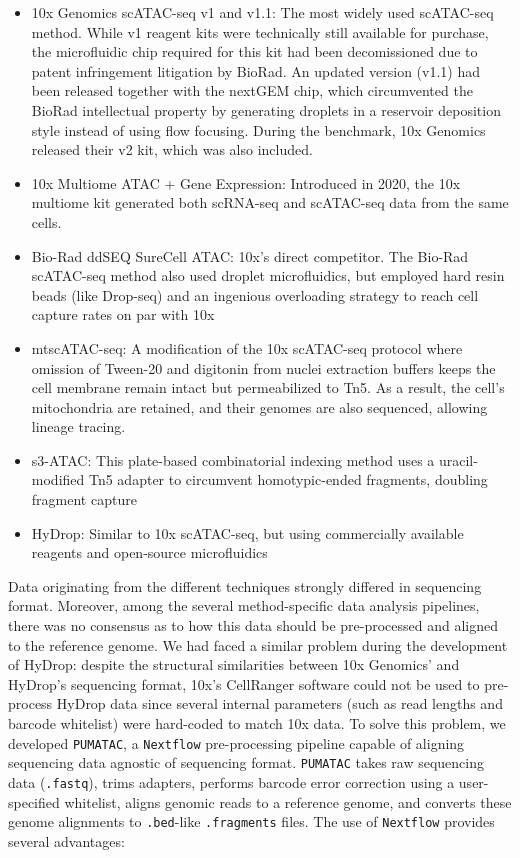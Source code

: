 \begin{itemize}[noitemsep]
	\item 10x Genomics scATAC-seq v1 and v1.1: The most widely used scATAC-seq method. While v1 reagent kits were technically still available for purchase, the microfluidic chip required for this kit had been decomissioned due to patent infringement litigation by BioRad. An updated version (v1.1) had been released together with the nextGEM chip, which circumvented the BioRad intellectual property by generating droplets in a reservoir deposition style instead of using flow focusing. During the benchmark, 10x Genomics released their v2 kit, which was also included.
	\item 10x Multiome ATAC + Gene Expression: Introduced in 2020, the 10x multiome kit generated both scRNA-seq and scATAC-seq data from the same cells.
	\item Bio-Rad ddSEQ SureCell ATAC: 10x's direct competitor. The Bio-Rad scATAC-seq method also used droplet microfluidics, but employed hard resin beads (like Drop-seq) and an ingenious overloading strategy to reach cell capture rates on par with 10x
	\item mtscATAC-seq: A modification of the 10x scATAC-seq protocol where omission of Tween-20 and digitonin from nuclei extraction buffers keeps the cell membrane remain intact but permeabilized to Tn5. As a result, the cell's mitochondria are retained, and their genomes are also sequenced, allowing lineage tracing.
	\item s3-ATAC: This plate-based combinatorial indexing method uses a uracil-modified Tn5 adapter to circumvent homotypic-ended fragments, doubling fragment capture
	\item HyDrop: Similar to 10x scATAC-seq, but using commercially available reagents and open-source microfluidics
\end{itemize}

Data originating from the different techniques strongly differed in sequencing format. Moreover, among the several method-specific data analysis pipelines, there was no consensus as to how this data should be pre-processed and aligned to the reference genome. We had faced a similar problem during the development of HyDrop: despite the structural similarities between 10x Genomics' and HyDrop's sequencing format, 10x's CellRanger software could not be used to pre-process HyDrop data since several internal parameters (such as read lengths and barcode whitelist) were hard-coded to match 10x data. To solve this problem, we developed \verb|PUMATAC|, a \verb|Nextflow| pre-processing pipeline capable of aligning sequencing data agnostic of sequencing format. \verb|PUMATAC| takes raw sequencing data (\verb|.fastq|), trims adapters, performs barcode error correction using a user-specified whitelist, aligns genomic reads to a reference genome, and converts these genome alignments to \verb|.bed|-like \verb|.fragments| files. The use of \verb|Nextflow| provides several advantages:


